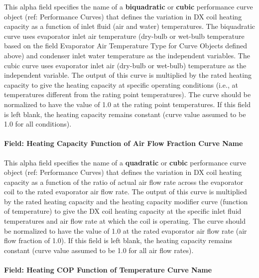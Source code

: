 This alpha field specifies the name of a \textbf{biquadratic} or \textbf{cubic} performance curve object (ref: Performance Curves) that defines the variation in DX coil heating capacity as a function of inlet fluid (air and water) temperatures. The biquadratic curve uses evaporator inlet air temperature (dry-bulb or wet-bulb temperature based on the field Evaporator Air Temperature Type for Curve Objects defined above) and condenser inlet water temperature as the independent variables. The cubic curve uses evaporator inlet air (dry-bulb or wet-bulb) temperature as the independent variable. The output of this curve is multiplied by the rated heating capacity to give the heating capacity at specific operating conditions (i.e., at temperatures different from the rating point temperatures). The curve should be normalized to have the value of 1.0 at the rating point temperatures. If this field is left blank, the heating capacity remains constant (curve value assumed to be 1.0 for all conditions).

\paragraph{Field: Heating Capacity Function of Air Flow Fraction Curve Name}\label{field-heating-capacity-function-of-air-flow-fraction-curve-name-1}

This alpha field specifies the name of a \textbf{quadratic} or \textbf{cubic} performance curve object (ref: Performance Curves) that defines the variation in DX coil heating capacity as a function of the ratio of actual air flow rate across the evaporator coil to the rated evaporator air flow rate. The output of this curve is multiplied by the rated heating capacity and the heating capacity modifier curve (function of temperature) to give the DX coil heating capacity at the specific inlet fluid temperatures and air flow rate at which the coil is operating. The curve should be normalized to have the value of 1.0 at the rated evaporator air flow rate (air flow fraction of 1.0). If this field is left blank, the heating capacity remains constant (curve value assumed to be 1.0 for all air flow rates).

\paragraph{Field: Heating COP Function of Temperature Curve Name}\label{field-heating-cop-function-of-temperature-curve-name-1}


